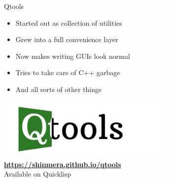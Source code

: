 \documentclass[14pt]{beamer}
\newcommand{\toptitle}[1]{
  {\huge #1} \\
  \vspace{0.2cm}
}
\begin{document}
\begin{frame}
  \toptitle{Qtools}
  \begin{itemize}
  \item Started out as collection of utilities
  \item Grew into a full convenience layer
  \item Now makes writing GUIs look normal
  \item Tries to take care of C++ garbage
  \item And all sorts of other things
  \end{itemize}
\end{frame}

\begin{frame}
  \begin{center}
    \hskip1.2cm\includegraphics[height=3cm]{qtools-logo.png} \\
    {\bfseries \url{https://shinmera.github.io/qtools}} \\
    \vspace{0.3cm}
    {\Large Available on Quicklisp}
  \end{center}
\end{frame}
\end{document}
